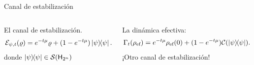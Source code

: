 \begin{frame}{Canal de estabilización}
    \begin{columns}
        \begin{column}{0.5\textwidth}
            El canal de estabilización.
            \begin{equation}
                \mcE_{\psi,t}(\varrho)=e^{-t\mu}\varrho+(1-e^{-t \mu})\dyad{\psi}\rlap{.}\nonumber\pause
            \end{equation}
            donde $\dyad{\psi}\in \densityspace{2^{n}}$
        \end{column}\pause
        \begin{column}{0.5\textwidth}
            La dinámica efectiva:\pause
            \begin{equation}\label{eq:EffectiveStabilizing}
                \Gamma_{t}(\rho_{\ef})=e^{-t\mu}\rho_{\ef}(0)+(1-e^{-t \mu})\mcC(\dyad{\psi}).\nonumber
            \end{equation}\pause
            ¡Otro canal de estabilización!
        \end{column}
    \end{columns}
\end{frame}



